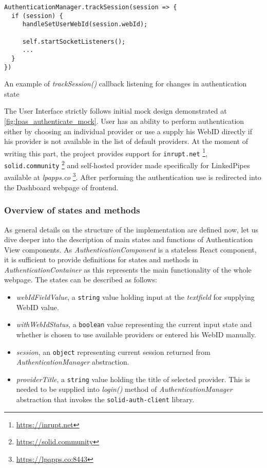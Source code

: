 \begin{listing}[H]    
\begin{verbatim}
AuthenticationManager.trackSession(session => {
  if (session) {
     handleSetUserWebId(session.webId);

     self.startSocketListeners();
     ...
  }
})
\end{verbatim}
\caption{An example of \textit{trackSession()} callback listening for changes in authentication state} 
\label{lst:track_session_example}
\end{listing}

The User Interface strictly follows initial mock design demonstrated at \autoref{fig:lpas_authenticate_mock}. User has an ability to perform authentication either by choosing an individual \solid{} provider or use a supply his WebID directly if his \solid{} provider is not available in the list of default providers. At the moment of writing this part, the project provides support for \texttt{inrupt.net} \footnote{\url{https://inrupt.net}}, \texttt{solid.community} \footnote{\url{https://solid.community}} and self-hosted provider made specifically for LinkedPipes available at \textit{lpapps.co} \footnote{\url{https://lpapps.co:8443}}. After performing the authentication use is redirected into the Dashboard webpage of \lpa{} frontend.

\subsubsection{Overview of states and methods}

As general details on the structure of the implementation are defined now, let us dive deeper into the description of main states and functions of Authentication View components. As \textit{AuthenticationComponent} is a stateless React component, it is sufficient to provide definitions for states and methods in \textit{AuthenticationContainer} as this represents the main functionality of the whole webpage. The states can be described as follows:
\begin{itemize}
    \item \textit{webIdFieldValue}, a \texttt{string} value holding input at the \textit{textfield} for supplying WebID value.
    \item \textit{withWebIdStatus}, a \texttt{boolean} value representing the current input state and whether is chosen to use available providers or entered his WebID manually.
    \item \textit{session}, an \texttt{object} representing current session returned from \textit{AuthenticationManager} abstraction.
    \item \textit{providerTitle}, a \texttt{string} value holding the title of selected provider. This is needed to be supplied into \textit{login()} method of \textit{AuthenticationManager} abstraction that invokes the \texttt{solid-auth-client} library.  
\end{itemize}

